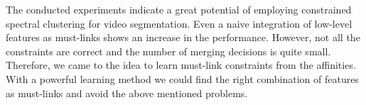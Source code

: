 

The conducted experiments indicate a great potential of employing constrained spectral clustering for video segmentation. 
Even a naive integration of low-level features as must-links shows an increase in the performance. However, not all the constraints are correct and the number of merging decisions is quite small. 
Therefore, we came to the idea to learn must-link constraints from the affinities. With a powerful learning method we could find the right combination of features as must-links and avoid the above mentioned problems.
